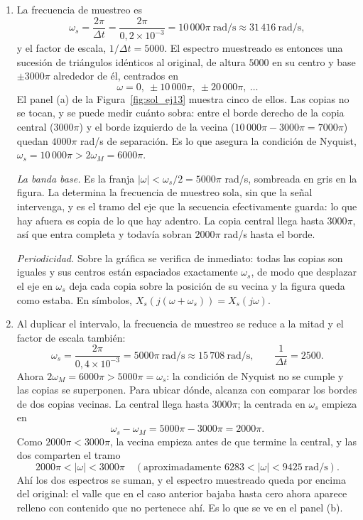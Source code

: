 \documentclass[10pt,a4paper]{article}
\begin{document}
	\begin{enumerate}
		\item La frecuencia de muestreo es
		\[
			\omega_s = \frac{2\pi}{\Delta t} = \frac{2\pi}{0{,}2\times10^{-3}}
			         = 10\,000\pi \ \text{rad/s} \approx 31\,416\ \text{rad/s},
		\]
		y el factor de escala, $1/\Delta t = 5000$. El espectro muestreado es entonces una
		sucesión de triángulos idénticos al original, de altura $5000$ en su centro y base
		$\pm 3000\pi$ alrededor de él, centrados en
		\[
			\omega = 0,\ \pm 10\,000\pi,\ \pm 20\,000\pi,\ \dots
		\]
		El panel (a) de la Figura~\ref{fig:sol_ej13} muestra cinco de ellos. Las copias no se
		tocan, y se puede medir cuánto sobra: entre el borde derecho de la copia central
		($3000\pi$) y el borde izquierdo de la vecina ($10\,000\pi - 3000\pi = 7000\pi$)
		quedan $4000\pi$ rad/s de separación. Es lo que asegura la condición de Nyquist,
		$\omega_s = 10\,000\pi > 2\omega_M = 6000\pi$.

		\emph{La banda base.} Es la franja $|\omega| < \omega_s/2 = 5000\pi$ rad/s, sombreada en
		gris en la figura. La determina la frecuencia de muestreo sola, sin que la señal
		intervenga, y es el tramo del eje que la secuencia efectivamente guarda: lo que hay
		afuera es copia de lo que hay adentro. La copia central llega hasta $3000\pi$, así que
		entra completa y todavía sobran $2000\pi$ rad/s hasta el borde.

		\emph{Periodicidad.} Sobre la gráfica se verifica de inmediato: todas las copias son
		iguales y sus centros están espaciados exactamente $\omega_s$, de modo que desplazar el
		eje en $\omega_s$ deja cada copia sobre la posición de su vecina y la figura queda como
		estaba. En símbolos, $X_s(j(\omega+\omega_s)) = X_s(j\omega)$.

		\item Al duplicar el intervalo, la
		frecuencia de muestreo se reduce a la mitad y el factor de escala también:
		\[
			\omega_s = \frac{2\pi}{0{,}4\times10^{-3}} = 5000\pi\ \text{rad/s}
			\approx 15\,708\ \text{rad/s},
			\qquad \frac{1}{\Delta t} = 2500 .
		\]
		Ahora $2\omega_M = 6000\pi > 5000\pi = \omega_s$: la condición de Nyquist no se cumple
		y las copias se superponen. Para ubicar dónde, alcanza con comparar los bordes de dos
		copias vecinas. La central llega hasta $3000\pi$; la centrada en $\omega_s$ empieza en
		\[
			\omega_s - \omega_M = 5000\pi - 3000\pi = 2000\pi .
		\]
		Como $2000\pi < 3000\pi$, la vecina empieza antes de que termine la central, y las dos
		comparten el tramo
		\[
			\boxed{\;2000\pi < |\omega| < 3000\pi \quad (\text{aproximadamente } 6283 <
			|\omega| < 9425 \ \text{rad/s}).\;}
		\]
		Ahí los dos espectros se suman, y el espectro muestreado queda por encima del
		original: el valle que en el caso anterior bajaba hasta cero ahora aparece relleno
		con contenido que no pertenece ahí. Es lo que se ve en el panel (b).


\end{enumerate}
\end{document}
